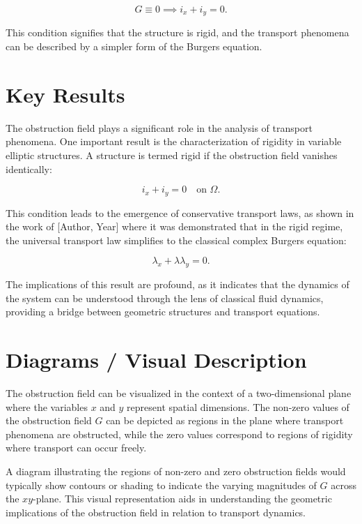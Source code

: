 \documentclass[11pt,a4paper]{article}
\begin{document}
\[
G \equiv 0 \implies i_x + i_y = 0.
\]

This condition signifies that the structure is rigid, and the transport phenomena can be described by a simpler form of the Burgers equation.

\section{Key Results}
The obstruction field plays a significant role in the analysis of transport phenomena. One important result is the characterization of rigidity in variable elliptic structures. A structure is termed rigid if the obstruction field vanishes identically:

\begin{equation}
i_x + i_y = 0 \quad \text{on } \Omega.
\end{equation}

This condition leads to the emergence of conservative transport laws, as shown in the work of [Author, Year] where it was demonstrated that in the rigid regime, the universal transport law simplifies to the classical complex Burgers equation:

\begin{equation}
\lambda_x + \lambda \lambda_y = 0.
\end{equation}

The implications of this result are profound, as it indicates that the dynamics of the system can be understood through the lens of classical fluid dynamics, providing a bridge between geometric structures and transport equations.

\section{Diagrams / Visual Description}
The obstruction field can be visualized in the context of a two-dimensional plane where the variables \(x\) and \(y\) represent spatial dimensions. The non-zero values of the obstruction field \(G\) can be depicted as regions in the plane where transport phenomena are obstructed, while the zero values correspond to regions of rigidity where transport can occur freely.

A diagram illustrating the regions of non-zero and zero obstruction fields would typically show contours or shading to indicate the varying magnitudes of \(G\) across the \(xy\)-plane. This visual representation aids in understanding the geometric implications of the obstruction field in relation to transport dynamics.
\end{document}
